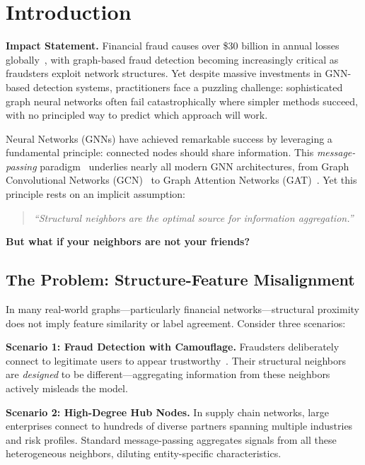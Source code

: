 \section{Introduction}
\label{sec:intro}

\textbf{Impact Statement.} Financial fraud causes over \$30 billion in annual losses globally~\cite{acfe2022fraud}, with graph-based fraud detection becoming increasingly critical as fraudsters exploit network structures. Yet despite massive investments in GNN-based detection systems, practitioners face a puzzling challenge: sophisticated graph neural networks often fail catastrophically where simpler methods succeed, with no principled way to predict which approach will work.

 Neural Networks (GNNs) have achieved remarkable success by leveraging a fundamental principle: connected nodes should share information. This \textit{message-passing} paradigm~\cite{gilmer2017mpnn} underlies nearly all modern GNN architectures, from Graph Convolutional Networks (GCN)~\cite{kipf2017gcn} to Graph Attention Networks (GAT)~\cite{velivckovic2018gat}. Yet this principle rests on an implicit assumption:

\begin{quote}
\textit{``Structural neighbors are the optimal source for information aggregation.''}
\end{quote}

\textbf{But what if your neighbors are not your friends?}

\subsection{The Problem: Structure-Feature Misalignment}

In many real-world graphs---particularly financial networks---structural proximity does not imply feature similarity or label agreement. Consider three scenarios:

\textbf{Scenario 1: Fraud Detection with Camouflage.} Fraudsters deliberately connect to legitimate users to appear trustworthy~\cite{dou2020enhancing}. Their structural neighbors are \textit{designed} to be different---aggregating information from these neighbors actively misleads the model.

\textbf{Scenario 2: High-Degree Hub Nodes.} In supply chain networks, large enterprises connect to hundreds of diverse partners spanning multiple industries and risk profiles. Standard message-passing aggregates signals from all these heterogeneous neighbors, diluting entity-specific characteristics.

